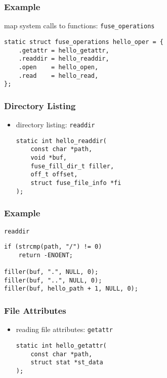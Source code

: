 \documentclass[dvipsnames]{beamer}
\begin{document}
\begin{frame}[fragile]
  \frametitle{Example}

  \begin{exampleblock}{map system calls to functions:
    \lstinline|fuse_operations|}
    \begin{lstlisting}
static struct fuse_operations hello_oper = {
    .getattr = hello_getattr,
    .readdir = hello_readdir,
    .open    = hello_open,
    .read    = hello_read,
};
    \end{lstlisting}
  \end{exampleblock}
\end{frame}

\begin{frame}[fragile]
  \frametitle{Directory Listing}

  \begin{itemize}
    \item directory listing: \lstinline|readdir|
    \begin{lstlisting}[style=syntax]
static int hello_readdir(
    const char *path,
    void *buf,
    fuse_fill_dir_t filler,
    off_t offset,
    struct fuse_file_info *fi
);
    \end{lstlisting}
  \end{itemize}
\end{frame}

\begin{frame}[fragile]
  \frametitle{Example}

  \begin{exampleblock}{\lstinline|readdir|}
    \begin{lstlisting}
if (strcmp(path, "/") != 0)
    return -ENOENT;

filler(buf, ".", NULL, 0);
filler(buf, "..", NULL, 0);
filler(buf, hello_path + 1, NULL, 0);
    \end{lstlisting}
  \end{exampleblock}
\end{frame}

\begin{frame}[fragile]
  \frametitle{File Attributes}

  \begin{itemize}
    \item reading file attributes: \lstinline|getattr|
    \begin{lstlisting}[style=syntax]
static int hello_getattr(
    const char *path,
    struct stat *st_data
);
    \end{lstlisting}
  \end{itemize}
\end{frame}
\end{document}
